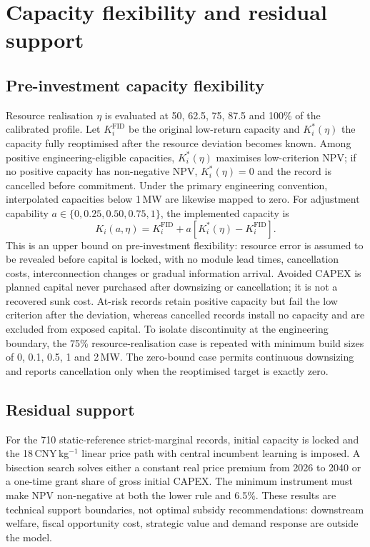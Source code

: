\documentclass[pdflatex,sn-nature]{sn-jnl}
\begin{document}
\section{Capacity flexibility and residual support}\label{sec:policy}

\subsection{Pre-investment capacity flexibility}

Resource realisation $\eta$ is evaluated at 50, 62.5, 75, 87.5 and 100\% of the calibrated profile. Let $K_i^{\mathrm{FID}}$ be the original low-return capacity and $K_i^*(\eta)$ the capacity fully reoptimised after the resource deviation becomes known. Among positive engineering-eligible capacities, $K_i^*(\eta)$ maximises low-criterion NPV; if no positive capacity has non-negative NPV, $K_i^*(\eta)=0$ and the record is cancelled before commitment. Under the primary engineering convention, interpolated capacities below 1\,MW are likewise mapped to zero. For adjustment capability $a\in\{0,0.25,0.50,0.75,1\}$, the implemented capacity is
\begin{equation}
K_i(a,\eta)=K_i^{\mathrm{FID}}+a\left[K_i^*(\eta)-K_i^{\mathrm{FID}}\right].
\label{eq:flexibility}
\end{equation}
This is an upper bound on pre-investment flexibility: resource error is assumed to be revealed before capital is locked, with no module lead times, cancellation costs, interconnection changes or gradual information arrival. Avoided CAPEX is planned capital never purchased after downsizing or cancellation; it is not a recovered sunk cost. At-risk records retain positive capacity but fail the low criterion after the deviation, whereas cancelled records install no capacity and are excluded from exposed capital. To isolate discontinuity at the engineering boundary, the 75\% resource-realisation case is repeated with minimum build sizes of 0, 0.1, 0.5, 1 and 2\,MW. The zero-bound case permits continuous downsizing and reports cancellation only when the reoptimised target is exactly zero.

\subsection{Residual support}

For the 710 static-reference strict-marginal records, initial capacity is locked and the 18\,CNY\,kg$^{-1}$ linear price path with central incumbent learning is imposed. A bisection search solves either a constant real price premium from 2026 to 2040 or a one-time grant share of gross initial CAPEX. The minimum instrument must make NPV non-negative at both the lower rule and 6.5\%. These results are technical support boundaries, not optimal subsidy recommendations: downstream welfare, fiscal opportunity cost, strategic value and demand response are outside the model.
\end{document}
